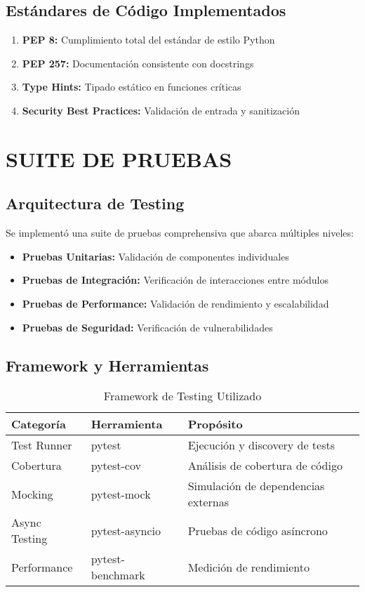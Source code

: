\documentclass[12pt,a4paper]{article}
\begin{document}
\subsection{Estándares de Código Implementados}

\begin{enumerate}
    \item \textbf{PEP 8:} Cumplimiento total del estándar de estilo Python
    \item \textbf{PEP 257:} Documentación consistente con docstrings
    \item \textbf{Type Hints:} Tipado estático en funciones críticas
    \item \textbf{Security Best Practices:} Validación de entrada y sanitización
\end{enumerate}

\section{SUITE DE PRUEBAS}

\subsection{Arquitectura de Testing}

Se implementó una suite de pruebas comprehensiva que abarca múltiples niveles:

\begin{itemize}
    \item \textbf{Pruebas Unitarias:} Validación de componentes individuales
    \item \textbf{Pruebas de Integración:} Verificación de interacciones entre módulos
    \item \textbf{Pruebas de Performance:} Validación de rendimiento y escalabilidad
    \item \textbf{Pruebas de Seguridad:} Verificación de vulnerabilidades
\end{itemize}

\subsection{Framework y Herramientas}

\begin{table}[h]
\centering
\begin{tabularx}{\textwidth}{|X|X|X|}
\hline
\textbf{Categoría} & \textbf{Herramienta} & \textbf{Propósito} \\
\hline
Test Runner & pytest & Ejecución y discovery de tests \\
\hline
Cobertura & pytest-cov & Análisis de cobertura de código \\
\hline
Mocking & pytest-mock & Simulación de dependencias externas \\
\hline
Async Testing & pytest-asyncio & Pruebas de código asíncrono \\
\hline
Performance & pytest-benchmark & Medición de rendimiento \\
\hline
\end{tabularx}
\caption{Framework de Testing Utilizado}
\end{table}
\end{document}
